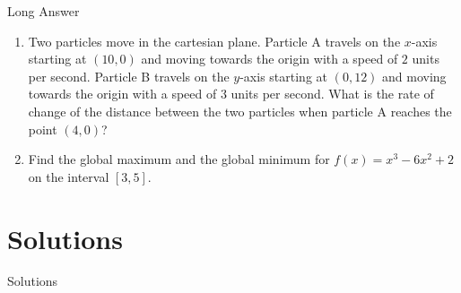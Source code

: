 {\begin{frame}{Long Answer}
\begin{enumerate}[L1.]
\item \label{L5}
Two particles move in the cartesian plane. Particle A travels on the $x$-axis 
starting at  $(10,0)$ and moving towards the origin with a speed of $2$ units 
per second. Particle B travels on the $y$-axis starting at $(0,12)$ and moving 
towards the origin with a speed of $3$ units per second. What is the rate of 
change of the distance between the two particles when particle A reaches the 
point $(4,0)$?  \hfill{}
\vfill

\item \label{L6}
Find the global maximum and the global minimum for $f(x)=x^3 - 6x^2 + 2$ on the interval $[3,5]$.
 \hfill{}
\vfill
\end{enumerate}
\end{frame}
\section{Solutions}
\begin{frame}
\huge\centering
Solutions
\end{frame}
}%
\setcounter{questionnumber}{1}
\newcommand{\qbox}[3]{
	\label{sol#1#2}
	\rule{\textwidth}{1pt}\\
	\mode<beamer>{\hfill \hyperlink{#1#2}{\beamerreturnbutton{back to questions}}\\
	#1\ref{#1#2}.}
	\mode<handout>{
	#1\thequestionnumber
	\stepcounter{questionnumber}}
	\quad #3 \\[1em]
	\rule{\textwidth}{1pt}
	}

